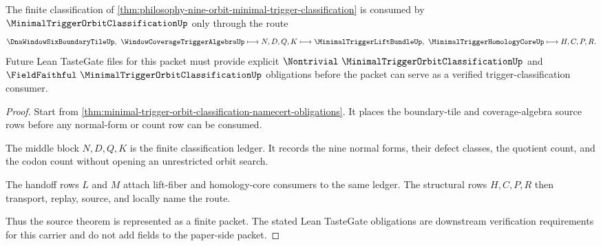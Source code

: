 \begin{theorem}
\label{thm:minimal-trigger-orbit-classification-vision-handoff}
The finite classification of \autoref{thm:philosophy-nine-orbit-minimal-trigger-classification} is consumed by $\MinimalTriggerOrbitClassificationUp$ only through the route
$$
\DnaWindowSixBoundaryTileUp,\ \WindowCoverageTriggerAlgebraUp
\longmapsto
N,D,Q,K
\longmapsto
\MinimalTriggerLiftBundleUp,\ \MinimalTriggerHomologyCoreUp
\longmapsto
H,C,P,R .
$$
Future Lean TasteGate files for this packet must provide explicit $\Nontrivial\ \MinimalTriggerOrbitClassificationUp$ and $\FieldFaithful\ \MinimalTriggerOrbitClassificationUp$ obligations before the packet can serve as a verified trigger-classification consumer.
\end{theorem}
\begin{proof}
Start from \autoref{thm:minimal-trigger-orbit-classification-namecert-obligations}. It places the boundary-tile and coverage-algebra source rows before any normal-form or count row can be consumed.

The middle block $N,D,Q,K$ is the finite classification ledger. It records the nine normal forms, their defect classes, the quotient count, and the codon count without opening an unrestricted orbit search.

The handoff rows $L$ and $M$ attach lift-fiber and homology-core consumers to the same ledger. The structural rows $H,C,P,R$ then transport, replay, source, and locally name the route.

Thus the source theorem is represented as a finite packet. The stated Lean TasteGate obligations are downstream verification requirements for this carrier and do not add fields to the paper-side packet.
\end{proof}



